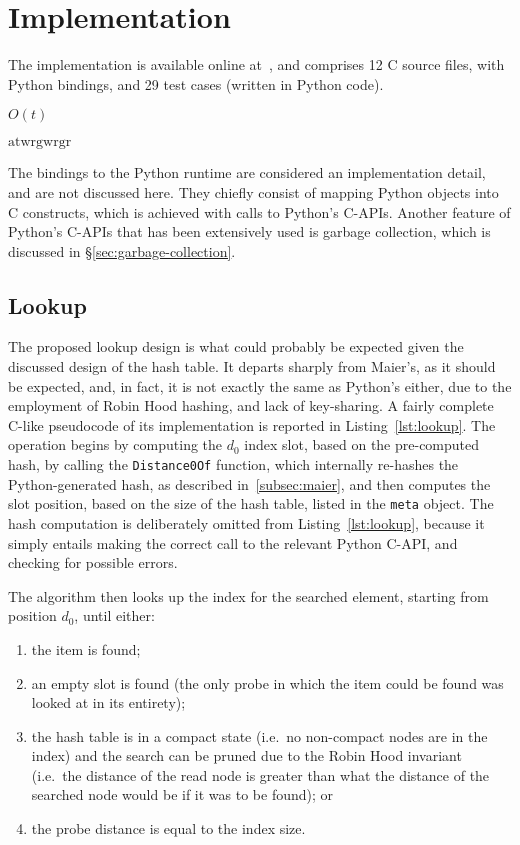 \chapter{Implementation}\label{ch:implementation}

The implementation is available online at~\cite[src/cereggii/atomic\_dict]{cereggii}, and comprises 12 C source files, with Python bindings, and 29 test cases (written in Python code).

\cite{peniocereus-greggii}

$O(t)$

$\textrm{atw} \textrm{rgw} \textrm{rgr}$

The bindings to the Python runtime are considered an implementation detail, and are not discussed here.
They chiefly consist of mapping Python objects into C constructs, which is achieved with calls to Python's C-APIs.
Another feature of Python's C-APIs that has been extensively used is garbage collection, which is discussed in \S\ref{sec:garbage-collection}.


\section{Lookup}\label{sec:lookup}

The proposed lookup design is what could probably be expected given the discussed design of the hash table.
It departs sharply from Maier's, as it should be expected, and, in fact, it is not exactly the same as Python's either, due to the employment of Robin Hood hashing, and lack of key-sharing.
A fairly complete C-like pseudocode of its implementation is reported in Listing~\ref{lst:lookup}.
The operation begins by computing the $d_0$ index slot, based on the pre-computed hash, by calling the \texttt{Distance0Of} function, which internally re-hashes the Python-generated hash, as described in~\ref{subsec:maier}, and then computes the slot position, based on the size of the hash table, listed in the \texttt{meta} object.
The hash computation is deliberately omitted from Listing~\ref{lst:lookup}, because it simply entails making the correct call to the relevant Python C-API, and checking for possible errors.

The algorithm then looks up the index for the searched element, starting from position $d_0$, until either:
\begin{enumerate}
	\item the item is found;
	\item an empty slot is found (the only probe in which the item could be found was looked at in its entirety);
	\item the hash table is in a compact state (i.e.\ no non-compact nodes are in the index) and the search can be pruned due to the Robin Hood invariant (i.e.\ the distance of the read node is greater than what the distance of the searched node would be if it was to be found); or
	\item the probe distance is equal to the index size.
\end{enumerate}

